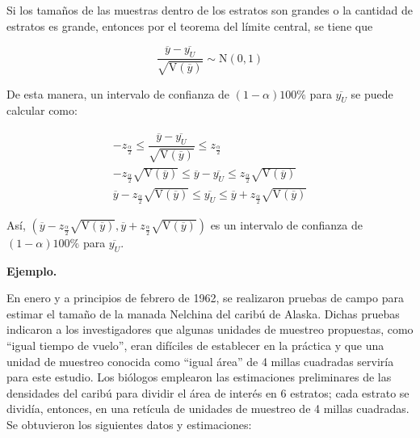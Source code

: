 \documentclass[12pt, fleqn]{article}
\newcommand{\V}[1]{\mathrm{V} \left( #1 \right)}
\begin{document}
    Si los tamaños de las muestras dentro de los estratos son grandes o la cantidad de estratos es grande, entonces por el teorema del límite central, se tiene que 

    \begin{equation*}
        \dfrac{\overline{y} - \overline{y_{U}}}{\sqrt{\V{\overline{y}}}} \sim \mathrm{N} (0,1)
    \end{equation*}

    De esta manera, un intervalo de confianza de $ (1 - \alpha) 100 \% $ para $ \overline{y_{U}} $ se puede calcular como:

    \begin{align*}
        -z_{\frac{\alpha}{2}} \leq \dfrac{\overline{y} - \overline{y_{U}}}{\sqrt{\V{\overline{y}}}} \leq z_{\frac{\alpha}{2}} \\
        -z_{\frac{\alpha}{2}} \sqrt{\V{\overline{y}}} \leq \overline{y} - \overline{y_{U}} \leq z_{\frac{\alpha}{2}} \sqrt{\V{\overline{y}}} \\
        \overline{y} - z_{\frac{\alpha}{2}} \sqrt{\V{\overline{y}}} \leq \overline{y_{U}} \leq \overline{y} + z_{\frac{\alpha}{2}} \sqrt{\V{\overline{y}}}
    \end{align*}

    Así, $ \left( \displaystyle \overline{y} - z_{\frac{\alpha}{2}} \sqrt{\V{\overline{y}}}, \overline{y} + z_{\frac{\alpha}{2}} \sqrt{\V{\overline{y}}} \right) $ es un intervalo de confianza de $ (1 - \alpha) 100 \% $ para $ \overline{y_{U}} $.

    \textbf{Ejemplo.}

    En enero y a principios de febrero de 1962, se realizaron pruebas de campo para estimar el tamaño de la manada Nelchina del caribú de Alaska. Dichas pruebas indicaron a los investigadores que algunas unidades de muestreo propuestas, como ``igual tiempo de vuelo'', eran difíciles de establecer en la práctica y que una unidad de muestreo conocida como ``igual área'' de 4 millas cuadradas serviría para este estudio. Los biólogos emplearon las estimaciones preliminares de las densidades del caribú para dividir el área de interés en 6 estratos; cada estrato se dividía, entonces, en una retícula de unidades de muestreo de 4 millas cuadradas. Se obtuvieron los siguientes datos y estimaciones:
\end{document}
